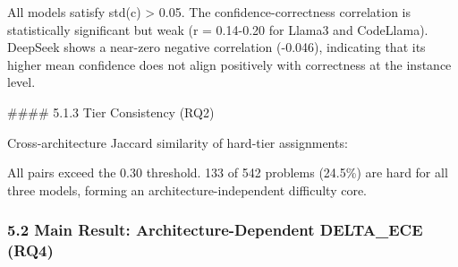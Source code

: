 All models satisfy std(c) > 0.05. The confidence-correctness correlation is statistically significant but weak (r = 0.14-0.20 for Llama3 and CodeLlama). DeepSeek shows a near-zero negative correlation (-0.046), indicating that its higher mean confidence does not align positively with correctness at the instance level.

\#\#\#\# 5.1.3 Tier Consistency (RQ2)

Cross-architecture Jaccard similarity of hard-tier assignments:

\begin{table}[htbp]
\centering
{}
\end{table}

All pairs exceed the 0.30 threshold. 133 of 542 problems (24.5\%) are hard for all three models, forming an architecture-independent difficulty core.

\subsubsection{5.2 Main Result: Architecture-Dependent DELTA\_ECE (RQ4)}

\begin{table}[htbp]
\centering
{}
\end{table}

